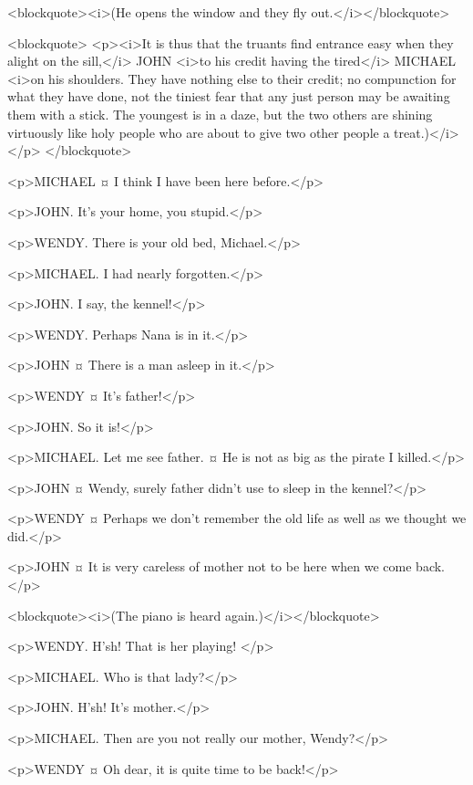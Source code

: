 <blockquote><i>(He opens the window and they fly out.</i></blockquote>

<blockquote> <p><i>It is thus that the truants find entrance easy when they alight on the sill,</i> JOHN <i>to his credit having the tired</i> MICHAEL <i>on his shoulders. They have nothing else to their credit; no compunction for what they have done, not the tiniest fear that any just person may be awaiting them with a stick. The youngest is in a daze, but the two others are shining virtuously like holy people who are about to give two other people a treat.)</i></p> </blockquote>

<p>MICHAEL ¤
I think I have been here before.</p>

<p>JOHN. It's your home, you stupid.</p>

<p>WENDY. There is your old bed, Michael.</p>

<p>MICHAEL. I had nearly forgotten.</p>

<p>JOHN. I say, the kennel!</p>

<p>WENDY. Perhaps Nana is in it.</p>

<p>JOHN ¤
There is a man asleep in it.</p>

<p>WENDY ¤
It's father!</p>

<p>JOHN. So it is!</p>

<p>MICHAEL. Let me see father.
¤
He is not as big as the pirate I killed.</p>

<p>JOHN ¤
Wendy, surely father didn't use to sleep in the kennel?</p>

<p>WENDY ¤
Perhaps we don't remember the old life as well as we thought we did.</p>

<p>JOHN ¤
It is very careless of mother not to be here when we come back.</p>

<blockquote><i>(The piano is heard again.)</i></blockquote>

<p>WENDY. H'sh!
That is her playing!
</p>

<p>MICHAEL. Who is that lady?</p>

<p>JOHN. H'sh! It's mother.</p>

<p>MICHAEL. Then are you not really our mother, Wendy?</p>

<p>WENDY ¤
Oh dear, it is quite time to be back!</p>


